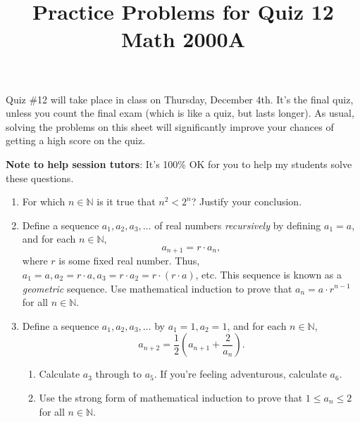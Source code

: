 \documentclass[letterpaper,12pt]{article}
\title{Practice Problems for Quiz 12\\Math 2000A}
\date{}
\newcommand{\N}{\mathbb{N}}
\begin{document}
 \maketitle
\vspace{-0.5in}

Quiz \#12 will take place in class on Thursday, December 4th. It's the final quiz, unless you count the final exam (which is like a quiz, but lasts longer).
As usual, solving the problems on this sheet will significantly improve your chances of getting a high score on the quiz.

{\bf Note to help session tutors}: It's 100\% OK for you to help my students solve these questions.
\begin{enumerate}
\item For which $n\in\N$ is it true that $n^2<2^n$? Justify your conclusion.
\item Define a sequence $a_1,a_2,a_3,\ldots$ of real numbers {\em recursively} by defining $a_1=a$, and for each $n\in\N$,
\[
 a_{n+1} = r\cdot a_n,
\]
where $r$ is some fixed real number. Thus, $a_1=a, a_2 = r\cdot a, a_3 = r\cdot a_2 = r\cdot (r\cdot a)$, etc. This sequence is known as a {\em geometric} sequence. Use mathematical induction to prove that $a_n = a\cdot r^{n-1}$ for all $n\in \N$.
\item Define a sequence $a_1, a_2, a_3, \ldots$ by $a_1 = 1, a_2 = 1$, and for each $n\in\N$,
\[
 a_{n+2} = \frac{1}{2}\left(a_{n+1}+\frac{2}{a_n}\right).
\]
\begin{enumerate}
 \item Calculate $a_3$ through to $a_5$. If you're feeling adventurous, calculate $a_6$.
 \item Use the strong form of mathematical induction to prove that $1\leq a_n\leq 2$ for all $n\in\N$.
\end{enumerate}


\end{enumerate}
\end{document}
